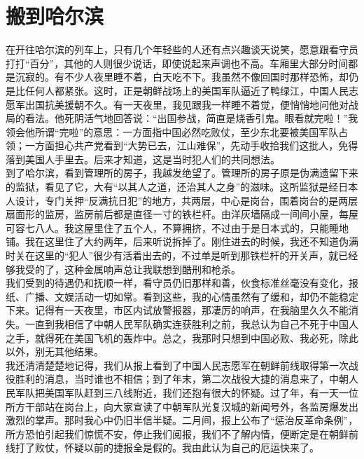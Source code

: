 \fancyhead[RO]{} %
\fancyhead[LE]{} %
\chapter*{搬到哈尔滨}
\thispagestyle{empty}
在开往哈尔滨的列车上，只有几个年轻些的人还有点兴趣谈天说笑，愿意跟看守员打打“百分”，其他的人则很少说话，即使说起来声调也不高。车厢里大部分时间都是沉寂的。有不少人夜里睡不着，白天吃不下。我虽然不像回国时那样恐怖，却仍是比任何人都紧张。这时，正是朝鲜战场上的美国军队逼近了鸭绿江，中国人民志愿军出国抗美援朝不久。有一天夜里，我见跟我一样睡不着觉，便悄悄地问他对战局的看法。他死阴活气地回答说：“出国参战，简直是烧香引鬼。眼看就完啦！”我领会他所谓“完啦”的意思：一方面指中国必然吃败仗，至少东北要被美国军队占领；一方面担心共产党看到“大势已去，江山难保”，先动手收拾我们这批人，免得落到美国人手里去。后来才知道，这是当时犯人们的共同想法。\\

到了哈尔滨，看到管理所的房子，我越发绝望了。管理所的房子原是伪满遗留下来的监狱，看见了它，大有“以其人之道，还治其人之身”的滋味。这所监狱是经日本人设计，专门关押“反满抗日犯”的地方，共两层，中心是岗台，围着岗台的是两层扇面形的监房，监房前后都是直径一寸的铁栏杆。由洋灰墙隔成一间间小屋，每屋可容七八人。我这屋里住了五个人，不算拥挤，不过由于是日本式的，只能睡地铺。我在这里住了大约两年，后来听说拆掉了。刚住进去的时候，我还不知道伪满时关在这里的“犯人”很少有活着出去的，不过单是听到那铁栏杆的开关声，就已经够我受的了，这种金属响声总让我联想到酷刑和枪杀。\\

我们受到的待遇仍和抚顺一样，看守员仍旧那样和善，伙食标准丝毫没有变化，报纸、广播、文娱活动一切如常。看到这些，我的心情虽然有了缓和，却仍不能稳定下来。记得有一天夜里，市区内试放警报器，那凄厉的响声，在我脑里久久不能消失。一直到我相信了中朝人民军队确实连获胜利之前，我总认为自己不死于中国人之手，就得死在美国飞机的轰炸中。总之，我那时只想到中国必败、我必死，除此以外，别无其他结果。\\

我还清清楚楚地记得，我们从报上看到了中国人民志愿军在朝鲜前线取得第一次战役胜利的消息，当时谁也不相信；到了年末，第二次战役大捷的消息来了，中朝人民军队把美国军队赶到三八线附近，我们还抱有很大的怀疑。过了年，有一天一位所方干部站在岗台上，向大家宣读了中朝军队光复汉城的新闻号外，各监房爆发出激烈的掌声。那时我心中仍旧半信半疑。二月间，报上公布了“惩治反革命条例”，所方恐怕引起我们惊慌不安，停止我们阅报，我们不了解内情，便断定是在朝鲜前线打了败仗，怀疑以前的捷报全是假的。我由此认为自己的厄运快来了。\\

